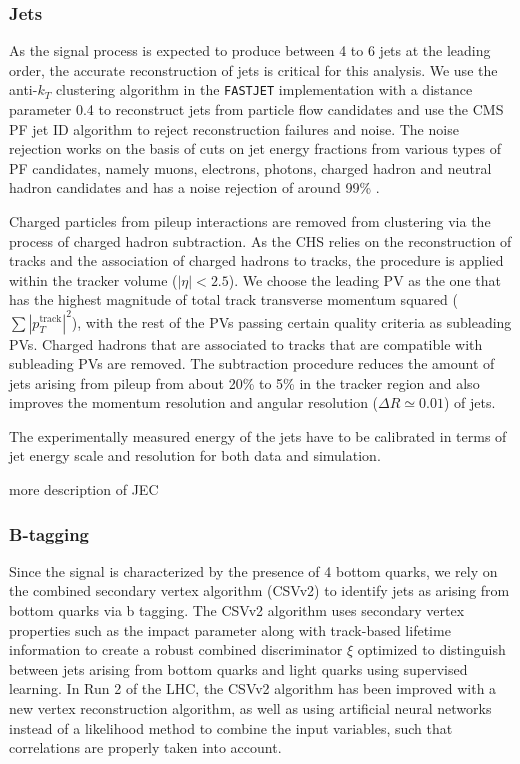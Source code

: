 \subsubsection{Jets}
\label{sec:object_id_jets}
As the signal process is expected to produce between 4 to 6 jets at the leading order, the accurate reconstruction of jets is critical for this analysis. We use the anti-$k_T$ clustering algorithm\cite{Cacciari:2008gp} in the \texttt{FASTJET} implementation\cite{Cacciari:2011ma} with a distance parameter 0.4 to reconstruct jets from particle flow candidates \cite{CMS:2010xta,CMS:2009nxa,CMS:2010byl} and use the CMS PF jet ID algorithm to reject reconstruction failures and noise. The noise rejection works on the basis of cuts on jet energy fractions from various types of PF candidates, namely muons, electrons, photons, charged hadron and neutral hadron candidates and has a noise rejection of around 99\% \cite{CMS:2017wyc}.

Charged particles from pileup interactions are removed from clustering via the process of charged hadron subtraction. As the CHS relies on the reconstruction of tracks and the association of charged hadrons to tracks, the procedure is applied within the tracker volume ($|\eta| < 2.5$). We choose the leading PV as the one that has the highest magnitude of total track transverse momentum squared ($\sum |p_T^{\mathrm{track}}|^2$), with the rest of the PVs passing certain quality criteria as subleading PVs. Charged hadrons that are associated to tracks that are compatible with subleading PVs are removed. The subtraction procedure reduces the amount of jets arising from pileup from about 20\% to 5\% in the tracker region and also improves the momentum resolution and angular resolution ($\Delta R \simeq 0.01$) of jets\cite{CMS:2014ata}.

The experimentally measured energy of the jets have to be calibrated in terms of jet energy scale and resolution for both data and simulation.

\fix more description of JEC

\subsubsection{B-tagging}
\label{sec:object_id_btag}

Since the \ttHbb signal is characterized by the presence of 4 bottom quarks, we rely on the combined secondary vertex algorithm (CSVv2) \cite{Chatrchyan:2012jua} to identify jets as arising from bottom quarks via b tagging. The CSVv2 algorithm uses secondary vertex properties such as the impact parameter along with track-based lifetime information to create a robust combined discriminator $\xi$ optimized to distinguish between jets arising from bottom quarks and light quarks using supervised learning. In Run 2 of the LHC, the CSVv2 algorithm has been improved with a new vertex reconstruction algorithm, as well as using artificial neural networks instead of a likelihood method to combine the input variables, such that correlations are properly taken into account\cite{CMS:2016kkf}.

